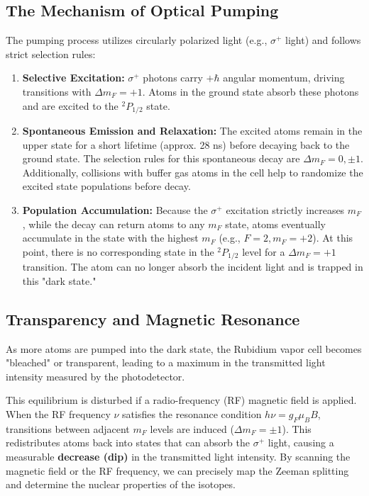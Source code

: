 \subsection{The Mechanism of Optical Pumping}
The pumping process utilizes circularly polarized light (e.g., $\sigma^+$ light) and follows strict selection rules:
\begin{enumerate}
    \item \textbf{Selective Excitation:} $\sigma^+$ photons carry $+\hbar$ angular momentum, driving transitions with \textbf{$\Delta m_F = +1$}. Atoms in the ground state absorb these photons and are excited to the $^{2}P_{1/2}$ state.
    \item \textbf{Spontaneous Emission and Relaxation:} The excited atoms remain in the upper state for a short lifetime (approx. 28 ns) before decaying back to the ground state. The selection rules for this spontaneous decay are $\Delta m_F = 0, \pm 1$. Additionally, collisions with buffer gas atoms in the cell help to randomize the excited state populations before decay.
    \item \textbf{Population Accumulation:} Because the $\sigma^+$ excitation strictly increases $m_F$, while the decay can return atoms to any $m_F$ state, atoms eventually accumulate in the state with the highest $m_F$ (e.g., $F=2, m_F=+2$). At this point, there is no corresponding state in the $^{2}P_{1/2}$ level for a $\Delta m_F = +1$ transition. The atom can no longer absorb the incident light and is trapped in this "dark state."
\end{enumerate}

\subsection{Transparency and Magnetic Resonance}
As more atoms are pumped into the dark state, the Rubidium vapor cell becomes "bleached" or transparent, leading to a maximum in the transmitted light intensity measured by the photodetector. 

This equilibrium is disturbed if a radio-frequency (RF) magnetic field is applied. When the RF frequency $\nu$ satisfies the resonance condition $h\nu = g_F \mu_B B$, transitions between adjacent $m_F$ levels are induced ($\Delta m_F = \pm 1$). This redistributes atoms back into states that can absorb the $\sigma^+$ light, causing a measurable \textbf{decrease (dip)} in the transmitted light intensity. By scanning the magnetic field or the RF frequency, we can precisely map the Zeeman splitting and determine the nuclear properties of the isotopes.